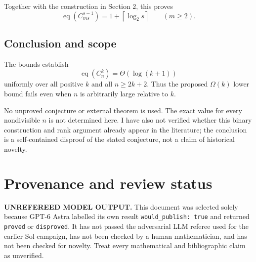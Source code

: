 \documentclass[
  11pt,
  a4paper,
]{article}
\begin{document}
Together with the construction in Section 2, this proves \[
\operatorname{eq}(C_{ms}^{s-1})
=1+\left\lceil\log_2s\right\rceil
\qquad(m\ge2).
\]

\subsection{Conclusion and scope}\label{conclusion-and-scope}

The bounds establish \[
\operatorname{eq}(C_n^k)=\Theta(\log(k+1))
\] uniformly over all positive \(k\) and all \(n\ge2k+2\). Thus the
proposed \(\Omega(k)\) lower bound fails even when \(n\) is arbitrarily
large relative to \(k\).

No unproved conjecture or external theorem is used. The exact value for
every nondivisible \(n\) is not determined here. I have also not
verified whether this binary construction and rank argument already
appear in the literature; the conclusion is a self-contained disproof of
the stated conjecture, not a claim of historical novelty.

\appendix

\section{Provenance and review
status}\label{provenance-and-review-status}

\begin{warning}

\textbf{UNREFEREED MODEL OUTPUT.} This document was selected solely
because GPT-6 Astra labelled its own result
\texttt{would\_publish:\ true} and returned \texttt{proved} or
\texttt{disproved}. It has not passed the adversarial LLM referee used
for the earlier Sol campaign, has not been checked by a human
mathematician, and has not been checked for novelty. Treat every
mathematical and bibliographic claim as unverified.

\end{warning}
\end{document}
